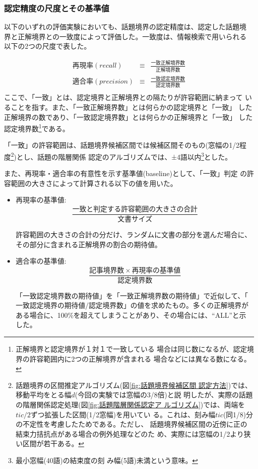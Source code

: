 \subsubsection{認定精度の尺度とその基準値}
\label{sect:基準値}

以下のいずれの評価実験においても、話題境界の認定精度は、認定した話題境
界と正解境界との一致度によって評価した。一致度は、情報検索で用いられる
以下の2つの尺度で表した。

\begin{eqnarray*}
  再現率(recall) &\equiv& \frac{一致正解境界数}{正解境界数}\\
  適合率(precision) &\equiv& \frac{一致認定境界数}{認定境界数}\\
\end{eqnarray*}
\noindent{}
ここで、「一致」とは、認定境界と正解境界との隔たりが許容範囲に納まって
いることを指す。また、「一致正解境界数」とは何らかの認定境界と「一致」
した正解境界の数であり、「一致認定境界数」とは何らかの正解境界と「一致」
した認定境界数\footnote{正解境界と認定境界が１対１で一致している
  場合は同じ数になるが、認定境界の許容範囲内に2つの正解境界が含まれる
  場合などには異なる数になる。}である。

「一致」の許容範囲は、話題境界候補区間では候補区間そのもの(窓幅の1/2程
度\footnote{話題境界の区間推定アルゴリズム(図\ref{fig:話題境界候補区間
    認定方法})では、移動平均をとる幅$d$(今回の実験では窓幅の3/8倍)と説
  明したが、実際の話題の階層関係認定処理(図\ref{fig:話題階層関係認定ア
    ルゴリズム})では、両端を$tic/2$ずつ拡張した区間(1/2窓幅)を用いてい
  る。これは、刻み幅$tic$(同1/8)分の不定性を考慮したためである。ただし、
  話題境界候補区間の近傍に正の結束力拮抗点がある場合の例外処理などのた
  め、実際には窓幅の1/2より狭い区間が若干ある。})とし、話題の階層関係
認定のアルゴリズムでは、±4語以内\footnote{最小窓幅(40語)の結束度の刻
  み幅(5語)未満という意味。}とした。

また、再現率・適合率の有意性を示す基準値(baseline)として、「一致」判定
の許容範囲の大きさによって計算される以下の値を用いた。

\begin{itemize}
\item 再現率の基準値:
  \[\frac{一致と判定する許容範囲の大きさの合計}{文書サイズ}\]

  許容範囲の大きさの合計の分だけ、ランダムに文書の部分を選んだ場合に、
  その部分に含まれる正解境界の割合の期待値。

\item 適合率の基準値:
  \[\frac{記事境界数 \times 再現率の基準値}{認定境界数}\]
  
  「一致認定境界数の期待値」を「一致正解境界数の期待値」で近似して、「
  一致認定境界の期待値/認定境界数」の値を求めたもの。多くの正解境界が
  ある場合に、100\%を超えてしまうことがあり、その場合には、``ALL''と示
  した。
\end{itemize}

